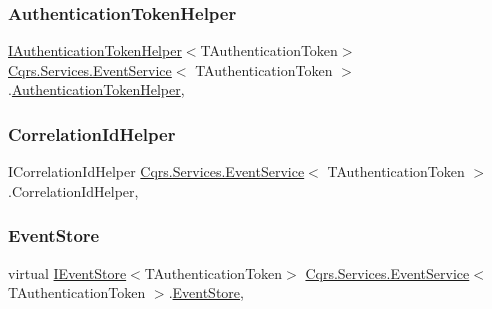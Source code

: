 \subsubsection{\texorpdfstring{Authentication\+Token\+Helper}{AuthenticationTokenHelper}}
{\footnotesize\ttfamily \hyperlink{interfaceCqrs_1_1Authentication_1_1IAuthenticationTokenHelper}{I\+Authentication\+Token\+Helper}$<$T\+Authentication\+Token$>$ \hyperlink{classCqrs_1_1Services_1_1EventService}{Cqrs.\+Services.\+Event\+Service}$<$ T\+Authentication\+Token $>$.\hyperlink{classCqrs_1_1Authentication_1_1AuthenticationTokenHelper}{Authentication\+Token\+Helper}\hspace{0.3cm}{\ttfamily [get]}, {\ttfamily [protected]}}

\mbox{\label{classCqrs_1_1Services_1_1EventService_a1c12d11de253a85f7257c412bca1532b_a1c12d11de253a85f7257c412bca1532b}} 
\subsubsection{\texorpdfstring{Correlation\+Id\+Helper}{CorrelationIdHelper}}
{\footnotesize\ttfamily I\+Correlation\+Id\+Helper \hyperlink{classCqrs_1_1Services_1_1EventService}{Cqrs.\+Services.\+Event\+Service}$<$ T\+Authentication\+Token $>$.Correlation\+Id\+Helper\hspace{0.3cm}{\ttfamily [get]}, {\ttfamily [protected]}}

\mbox{\label{classCqrs_1_1Services_1_1EventService_a07e516aae58050ab225f5ce5f1830ff6_a07e516aae58050ab225f5ce5f1830ff6}} 
\subsubsection{\texorpdfstring{Event\+Store}{EventStore}}
{\footnotesize\ttfamily virtual \hyperlink{interfaceCqrs_1_1Events_1_1IEventStore}{I\+Event\+Store}$<$T\+Authentication\+Token$>$ \hyperlink{classCqrs_1_1Services_1_1EventService}{Cqrs.\+Services.\+Event\+Service}$<$ T\+Authentication\+Token $>$.\hyperlink{classCqrs_1_1Events_1_1EventStore}{Event\+Store}\hspace{0.3cm}{\ttfamily [get]}, {\ttfamily [protected]}}

